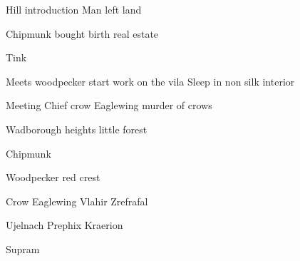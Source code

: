 \documentclass[smalldemyvopaper,11pt,twoside,onecolumn,openright,extrafontsizes]{memoir}
\begin{document}
\newpage

\vspace*{4.3cm}
\begin{localsize}{10}
	\begin{quote}
	\end{quote} 
\end{localsize}
\vspace{1cm}


\newpage
 Hill introduction Man left land

 Chipmunk bought birth real estate
 
 Tink

 Meets woodpecker start work on the vila
 Sleep in non silk interior

Meeting Chief crow Eaglewing murder of crows

Wadborough heights little forest 

Chipmunk 

Woodpecker 
red crest

Crow Eaglewing
Vlahir
Zrefrafal

Ujelnach
Prephix
Kraerion

Supram

\end{document}
